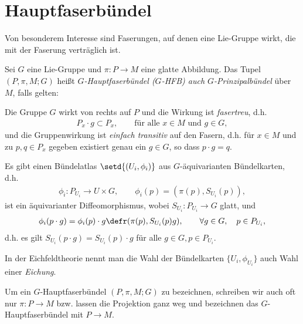 \documentclass[%
	paper=a5,%
	fleqn,%
	DIV=18,%
	BCOR=0mm,
	fontsize=11pt,
	titlepage=false,%
	bibliography=totoc,
	DIV=18,%
	twoside=true,
	pdftitle=Riemannsche Geometrie,
	pdfauthor=Uwe Semmelmann,
	numbers=noendperiod]%
	{scrbook}
\begin{document}
\section{Hauptfaserbündel}

Von besonderem Interesse sind Faserungen, auf denen eine Lie-Gruppe wirkt,
die mit der Faserung verträglich ist.

\begin{defn}
Sei $G$ eine Lie-Gruppe und $\pi\colon P\to M$ eine glatte Abbildung. Das Tupel
$(P,\pi,M;G)$ heißt \emph{$G$-Hauptfaserbündel ($G$-HFB) auch
$G$-Prinzipalbündel} über $M$, falls gelten:
\begin{defnenum}
  \item Die Gruppe $G$ wirkt von rechts auf $P$ und die Wirkung ist \emph{fasertreu},
  d.h.
  \begin{align*}
  P_x\cdot g \subset P_x,\qquad \text{für alle }x\in M\text{ und }g\in G,
  \end{align*}
  und die Gruppenwirkung ist \emph{einfach transitiv} auf den Fasern, d.h. für
  $x\in M$ und zu $p,q\in P_x$ gegeben existiert genau ein $g\in G$, so dass
  $p\cdot g = q$.
  \item Es gibt einen Bündelatlas $\setd{(U_i,\phi_i)}$ aus $G$-äquivarianten
  Bündelkarten, d.h.
  \begin{align*}
  \phi_i : P_{U_i}\to U\times G,\qquad
  \phi_i(p) = (\pi(p),S_{U_i}(p)),
  \end{align*}
  ist ein äquivarianter  Diffeomorphismus, wobei $S_{U_i}\colon P_{U_i}\to G$ glatt, und
  \begin{align*}
  \phi_i(p\cdot g) = \phi_i(p)\cdot g \defr (\pi(p),S_{U_i}(p)g),\qquad \forall g\in
  G,\quad p\in P_{U_i},
  \end{align*}
  d.h. es gilt $S_{U_i}(p\cdot g) = S_{U_i}(p) \cdot g$ für alle $g \in G, p \in P_{U_i}$. \fish
\end{defnenum}
\end{defn}

In der Eichfeldtheorie nennt man die Wahl der Bündelkarten $\{U_i, \phi_{U_i}\}$ auch Wahl
einer \emph{Eichung}.

\begin{rem}[Notation.]
Um ein $G$-Hauptfaserbündel $(P,\pi,M;G)$ zu bezeichnen, schreiben wir auch oft
nur $\pi\colon P\to M$ bzw. lassen die Projektion ganz weg und bezeichnen das
$G$-Hauptfaserbündel mit $P\to M$.\map
\end{rem}
\end{document}

